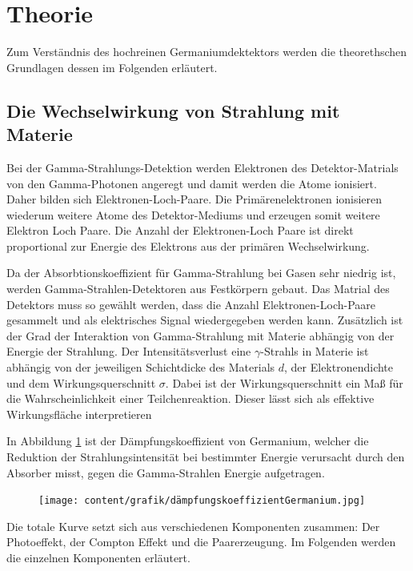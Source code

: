 \section[Theorie]{Theorie \textnormal{\cite{germanium}}}
\label{sec:theorie}

Zum Verständnis des hochreinen Germaniumdektektors werden die theorethschen Grundlagen dessen im Folgenden erläutert.

\subsection{Die Wechselwirkung von Strahlung mit Materie}
\label{sec:WW mit Materie}

Bei der Gamma-Strahlungs-Detektion werden Elektronen des Detektor-Matrials von den Gamma-Photonen angeregt und damit werden die 
Atome ionisiert. Daher bilden sich Elektronen-Loch-Paare. Die Primärenelektronen ionisieren wiederum weitere Atome des Detektor-Mediums und erzeugen somit weitere Elektron Loch Paare.
Die Anzahl der Elektronen-Loch Paare ist direkt proportional zur Energie des Elektrons aus der primären
Wechselwirkung.

Da der Absorbtionskoeffizient für Gamma-Strahlung bei Gasen sehr niedrig ist, 
werden Gamma-Strahlen-Detektoren aus Festkörpern gebaut. Das Matrial des Detektors muss so gewählt werden, dass
die Anzahl Elektronen-Loch-Paare gesammelt und als elektrisches Signal wiedergegeben werden kann.
Zusätzlich ist der Grad der Interaktion von Gamma-Strahlung mit Materie abhängig von der Energie der Strahlung.
Der Intensitätsverlust  eine $\gamma$-Strahls in Materie ist abhängig von der jeweiligen Schichtdicke des Materials $d$,
der Elektronendichte und dem Wirkungsquerschnitt $\sigma$. Dabei ist der Wirkungsquerschnitt ein Maß für die Wahrscheinlichkeit einer Teilchenreaktion.
Dieser lässt sich als effektive Wirkungsfläche interpretieren

In Abbildung \ref{fig:koeffizient} ist der Dämpfungskoeffizient von Germanium, welcher die Reduktion der Strahlungsintensität
bei bestimmter Energie verursacht durch den Absorber misst, gegen die Gamma-Strahlen Energie aufgetragen.


\begin{figure}[H]
    \centering
    \texttt{[image: content/grafik/dämpfungskoeffizientGermanium.jpg]}
    \caption{ \cite{gamma_ray}}
    \label{fig:koeffizient}
\end{figure}

Die totale Kurve setzt sich aus verschiedenen Komponenten zusammen: Der Photoeffekt, der Compton Effekt und die Paarerzeugung.
Im Folgenden werden die einzelnen Komponenten erläutert.


